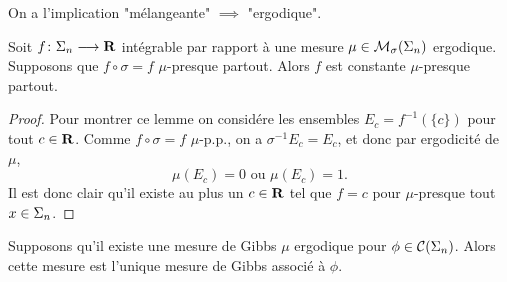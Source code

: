   \begin{remark}
    On a l'implication "mélangeante" $\implies$ "ergodique".
  \end{remark}

  \begin{lemma}
    \label{lem:sig_inv_imp_cst}
    \leanok
    Soit $f \colon \Sigma_n \longrightarrow \mathbf R$ intégrable par rapport à une mesure $\mu \in \mathcal{M}_{\sigma}(\Sigma_{n})$ ergodique.
    Supposons que $f \circ \sigma = f$ $\mu$-presque partout.
    Alors $f$ est constante $\mu$-presque partout.
  \end{lemma}

  \begin{proof}
    Pour montrer ce lemme on considére les ensembles $E_c = f^{-1}(\{c\})$ pour tout $c\in\mathbf R$.
    Comme $f \circ \sigma = f$ $\mu$-p.p., on a $\sigma^{-1}E_c = E_c$, et donc par ergodicité de $\mu$,
    $$\mu(E_c) = 0 \text{ ou } \mu(E_c) = 1.$$
    Il est donc clair qu'il existe au plus un $c\in\mathbf R$ tel que $f = c$ pour $\mu$-presque tout $x \in \Sigma_n$.
  \end{proof}

  \begin{proposition}
    \label{prop:unique}
    \leanok
    Supposons qu'il existe une mesure de Gibbs $\mu$ ergodique pour $\phi \in \mathcal{C} (\Sigma_{n})$.
    Alors cette mesure est l'unique mesure de Gibbs associé à $\phi$.
  \end{proposition}

